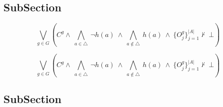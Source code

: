 \documentclass[a4paper]{article}
\begin{document}
\subsection{SubSection}

\[\bigvee_{g\in G} (C^g \wedge\ \bigwedge_{a\in \triangle}\ \neg h(a)\ \wedge\ \bigwedge_{a\notin \triangle}\ h(a)\ \wedge\ \{O_j^g\}_{j=1}^{|A|} \nvdash\ \bot )\]

\[\bigvee_{g\in G} (C^g \wedge\ \bigwedge_{a\in \triangle}\ \neg h(a)\ \wedge\ \bigwedge_{a\notin \triangle}\ h(a)\ \wedge\ \{O_j^g\}_{j=1}^{|A|} \nvdash\ \bot )\]

\subsection{SubSection}
\end{document}
